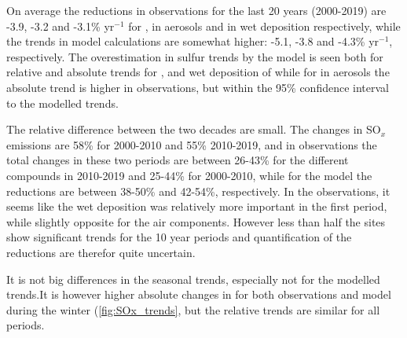 On average the reductions in observations for the last 20 years (2000-2019) are -3.9, -3.2 and -3.1\% yr$^{-1}$ for \soii, \soiv in aerosols and in wet deposition respectively, while the trends in model calculations are somewhat higher: -5.1, -3.8 and -4.3\% yr$^{-1}$, respectively. The overestimation in sulfur trends by the model is seen both for relative and absolute trends for \soii, and wet deposition of \soiv while for \soiv in aerosols the absolute trend is higher in observations, but within the 95\% confidence interval to the modelled trends.  

The relative difference between the two decades are small. The changes in SO$_x$ emissions are 58\% for 2000-2010 and 55\% 2010-2019, and in observations the total changes in these two periods are between 26-43\% for the different compounds in 2010-2019 and 25-44\% for 2000-2010, while for the model the reductions are between 38-50\% and 42-54\%, respectively.  In the observations, it seems like the wet deposition was relatively more important in the first period, while slightly opposite for the air components.	However less than half the sites show significant trends for the 10 year periods and quantification of the reductions are therefor quite uncertain. 

It is not big differences in the seasonal trends, especially not for the modelled trends.It is however higher absolute changes in \soii for both observations and model during the winter (\ref{fig:SOx_trends}, but the relative trends are similar for all periods.

